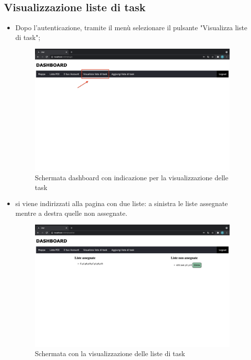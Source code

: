 \subsection{Visualizzazione liste di task}
\begin{itemize}
    \item Dopo l'autenticazione, tramite il menù selezionare il pulsante "Visualizza liste di task";
    \begin{figure}[H]
        \centering
        \includegraphics[scale=0.2]{res/images/dashboard8.png}
        \caption{Schermata dashboard con indicazione per la visualizzazione delle task}
    \end{figure}
    \item si viene indirizzati alla pagina con due liste: a sinistra le liste assegnate mentre a destra quelle non assegnate.
    \begin{figure}[H]
        \centering
        \includegraphics[scale=0.2]{res/images/tasklist.png}
        \caption{Schermata con la visualizzazione delle liste di task}

\end{figure}
\end{itemize}
